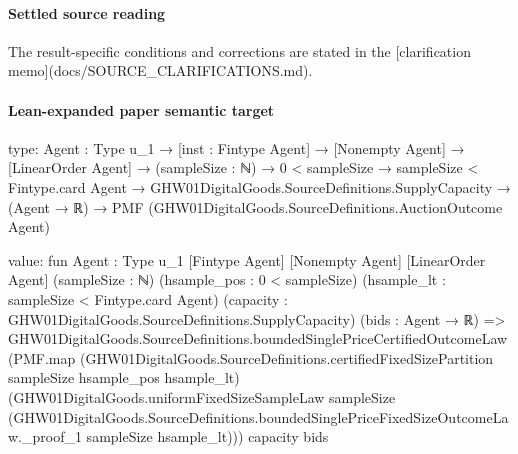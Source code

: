 \documentclass[10pt]{article}
\begin{document}
\paragraph{Settled source reading}
\begin{sloppypar}
The result-\allowbreak{}specific conditions and corrections are stated in the [clarification memo](docs/\allowbreak{}SOURCE\_\allowbreak{}CLARIFICATIONS.\allowbreak{}md).\allowbreak{}
\end{sloppypar}

\paragraph{Lean-expanded paper semantic target}
\begin{ReviewVerbatim}
type:
{Agent : Type u_1} →
  [inst : Fintype Agent] →
    [Nonempty Agent] →
      [LinearOrder Agent] →
        (sampleSize : ℕ) →
          0 < sampleSize →
            sampleSize < Fintype.card Agent →
              GHW01DigitalGoods.SourceDefinitions.SupplyCapacity →
                (Agent → ℝ) → PMF (GHW01DigitalGoods.SourceDefinitions.AuctionOutcome Agent)

value:
fun {Agent : Type u_1} [Fintype Agent] [Nonempty Agent] [LinearOrder Agent] (sampleSize : ℕ)
    (hsample_pos : 0 < sampleSize) (hsample_lt : sampleSize < Fintype.card Agent)
    (capacity : GHW01DigitalGoods.SourceDefinitions.SupplyCapacity) (bids : Agent → ℝ) =>
  GHW01DigitalGoods.SourceDefinitions.boundedSinglePriceCertifiedOutcomeLaw
    (PMF.map (GHW01DigitalGoods.SourceDefinitions.certifiedFixedSizePartition sampleSize hsample_pos hsample_lt)
      (GHW01DigitalGoods.uniformFixedSizeSampleLaw sampleSize
        (GHW01DigitalGoods.SourceDefinitions.boundedSinglePriceFixedSizeOutcomeLaw._proof_1 sampleSize hsample_lt)))
    capacity bids
\end{ReviewVerbatim}
\end{document}
